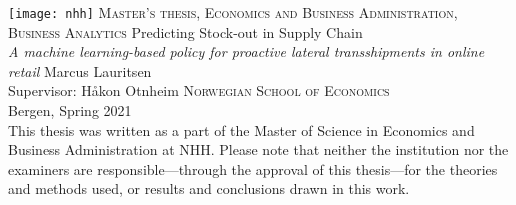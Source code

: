 \documentclass[../../main.tex]{subfiles}
\begin{document}
\begin{titlepage}
    \centering
    \texttt{[image: nhh]}
    \vfill
    \large{\textsc{Master's thesis, Economics and Business Administration, Business Analytics}}    
    \vfill
    \Huge{Predicting Stock-out in Supply Chain}
    \\         
	\vspace{16pt}
    \large{\textit{A machine learning-based policy for proactive lateral transshipments in online retail}}
    \vfill        
    \large{Marcus Lauritsen \\
    Supervisor: Håkon Otnheim}
    \vfill
    \vfill
    \normalsize
    \textsc{Norwegian School of Economics} \\
	Bergen, Spring 2021 \\
	\vspace{16pt}
    This thesis was written as a part of the Master of Science in Economics and Business Administration at NHH. Please note that neither the institution nor the examiners are responsible---through the approval of this thesis---for the theories and methods used, or results and conclusions drawn in this work.
\end{titlepage}
\end{document}
